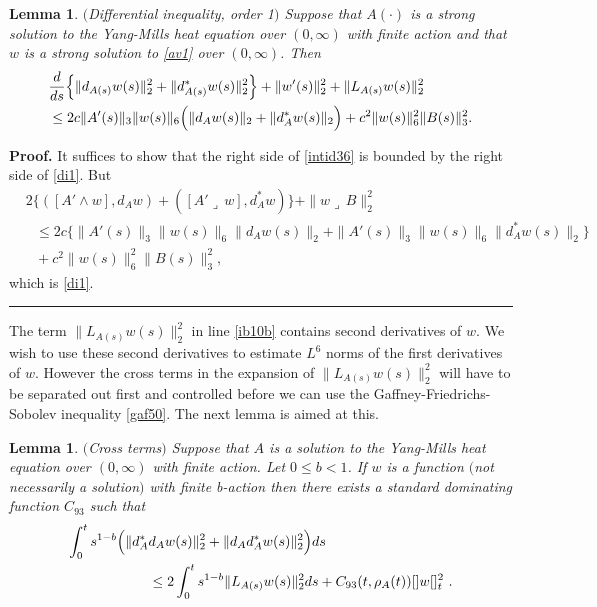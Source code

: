 \documentclass[12pt]{article}
\newtheorem{lemma}[theorem]{Lemma}
\newenvironment{proof}[1][Proof]{\textbf{#1.} }{\ \rule{0.5em}{0.5em}}
\def \nn{[]}
\def \eref{\eqref}
\def \lrc{\lrcorner\,}
\numberwithin{equation}{section}
\begin{document}
\begin{lemma}\label{propdi1}$($Differential inequality, order 1$)$  
Suppose that $A(\cdot)$ 
is a strong solution to the Yang-Mills heat equation over $(0,  \infty)$  
 with finite action
 and that $w$ is a  strong solution to \eref{av1} over $(0, \infty)$.  
Then
\begin{align}
&\frac{d}{ds} \Big\{ \| d_{A(s)} w(s) \|_2^2 + \| d_{A(s)}^* w(s) \|_2^2\Big\} \notag
  + \| w'(s)\|_2^2 + \| L_{A(s)} w(s)\|_2^2 \\
 &\le 2c  \|A'(s)\|_3 \|w(s)\|_6 \Big(\| d_A w(s)\|_2 + \| d_A^* w(s)\|_2\Big) 
 +   c^2 \|w(s)\|_6^2 \| B(s)\|_3^2  .                                                  \label{di1}                                
  \end{align}
  \end{lemma}
         \begin{proof}
         It suffices to show that the right side of \eref{intid36} is bounded by the right side 
         of \eref{di1}. But
         \begin{align*}
      &2\Big\{ ([A'\wedge w], d_A w) + ( [A'\lrc w], d_A^* w)\Big\}  + \|w\lrc B\|_2^2 \\ 
  &\ \ \  \le  2c \Big\{ \|A'(s)\|_3 \|w(s)\|_6 \| d_A w(s)\|_2 
                          +   \|A'(s)\|_3 \|w(s)\|_6 \| d_A^* w(s)\|_2 \Big\} \\
     &\ \ \ +c^2 \|w(s)\|_6^2 \| B(s)\|_3^2,
      \end{align*}
which is \eref{di1}.      
      \end{proof}
      

The term $\| L_{A(s)} w(s)\|_2^2$ in line \eref{ib10b} contains second derivatives of $w$. We wish
to use these second derivatives to estimate $L^6$ norms of the first derivatives of $w$.
 However the cross terms
in the expansion of $\|L_{A(s)} w(s)\|_2^2$ will have to be separated out first and controlled 
before we can use the Gaffney-Friedrichs-Sobolev  inequality \eref{gaf50}. 
The next lemma is aimed at this.


\begin{lemma} \label{lemcross} $($Cross terms$)$
Suppose that $A$ is a solution to the Yang-Mills heat equation over $(0, \infty )$ 
 with finite action.
Let $0 \le b <1$. If  $w$ is a function 
$($not necessarily  a solution$)$ with finite b-action then there exists a standard
 dominating  function $C_{93}$  such that 
\begin{align}
\int_0^t s^{1-b}\Big(\|d_A^*&d_A w(s)\|_2^2  + \| d_A d_A^* w(s)\|_2^2\Big) ds  \notag\\
&\le   2\int_0^t s^{1-b}\| L_{A(s)} w(s)\|_2^2 ds  
 + C_{93}(t ,\rho_A(t)) \nn w\nn_t^2 \ .  
                                                       \label{ib2b}
\end{align}
\end{lemma}
\end{document}
